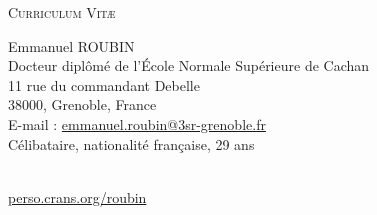 \documentclass[a4paper,11pt]{article}
\begin{document}
\begin{center} \par\textsc{\huge Curriculum Vit\ae} \end{center}
\begin{minipage}{0.7\linewidth}
  \begin{flushleft}
    \LARGE Emmanuel ROUBIN \normalsize  \vspace{0.1cm} \\
    \large Docteur diplômé de l'École Normale Supérieure de Cachan \normalsize\\\vspace{0.2cm}
    11 rue du commandant Debelle\\
    38000, Grenoble, France\\\vspace{0.2cm}
    E-mail : \href{mailto:emmanuel.roubin@3sr-grenoble.fr}{emmanuel.roubin@3sr-grenoble.fr}\\
    Célibataire, nationalité fran\c caise, 29 ans\\
  \end{flushleft}
\end{minipage}
\hfill
\begin{minipage}{4cm}
  \centering
   \\ \vspace{0.1cm}
  \footnotesize\href{http://perso.crans.org/roubin}{perso.crans.org/roubin}
\end{minipage}
\vspace{0.5cm}
\end{document}
